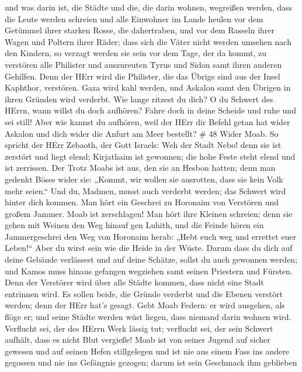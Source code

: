 und was darin ist, die Städte und die, die darin wohnen, wegreißen
werden, dass die Leute werden schreien und alle Einwohner im Lande
heulen  vor dem Getümmel ihrer starken Rosse, die
dahertraben, und vor dem Rasseln ihrer Wagen und Poltern ihrer Räder;
dass sich die Väter nicht werden umsehen nach den Kindern, so verzagt
werden sie sein  vor dem Tage, der da kommt, zu verstören
alle Philister und auszureuten Tyrus und Sidon samt ihren anderen
Gehilfen. Denn der HErr wird die Philister, die das Übrige sind aus der
Insel Kaphthor, verstören.  Gaza wird kahl werden, und
Askalon samt den Übrigen in ihren Gründen wird verderbt. Wie lange
ritzest du dich?  O du Schwert des HErrn, wann willst du
doch aufhören? Fahre doch in deine Scheide und ruhe und sei still!
 Aber wie kannst du aufhören, weil der HErr dir Befehl getan
hat wider Askalon und dich wider die Anfurt am Meer bestellt? \# 48
 Wider Moab. So spricht der HErr Zebaoth, der Gott Israels:
Weh der Stadt Nebo! denn sie ist zerstört und liegt elend; Kirjathaim
ist gewonnen; die hohe Feste steht elend und ist zerrissen. 
Der Trotz Moabs ist aus, den sie an Hesbon hatten; denn man gedenkt
Böses wider sie: „Kommt, wir wollen sie ausrotten, dass sie kein Volk
mehr seien.`` Und du, Madmen, musst auch verderbt werden; das Schwert
wird hinter dich kommen.  Man hört ein Geschrei zu Horonaim
von Verstören und großem Jammer.  Moab ist zerschlagen! Man
hört ihre Kleinen schreien;  denn sie gehen mit Weinen den
Weg hinauf gen Luhith, und die Feinde hören ein Jammergeschrei den Weg
von Horonaim herab:  „Hebt euch weg und errettet euer
Leben!{}`` Aber du wirst sein wie die Heide in der Wüste. 
Darum dass du dich auf deine Gebäude verlässest und auf deine Schätze,
sollst du auch gewonnen werden; und Kamos muss hinaus gefangen wegziehen
samt seinen Priestern und Fürsten.  Denn der Verstörer wird
über alle Städte kommen, dass nicht eine Stadt entrinnen wird. Es sollen
beide, die Gründe verderbt und die Ebenen verstört werden; denn der HErr
hat's gesagt.  Gebt Moab Federn: er wird ausgehen, als flöge
er; und seine Städte werden wüst liegen, dass niemand darin wohnen wird.
 Verflucht sei, der des HErrn Werk lässig tut; verflucht
sei, der sein Schwert aufhält, dass es nicht Blut vergieße!
 Moab ist von seiner Jugend auf sicher gewesen und auf
seinen Hefen stillgelegen und ist nie aus einem Fass ins andere gegossen
und nie ins Gefängnis gezogen; darum ist sein Geschmack ihm geblieben
